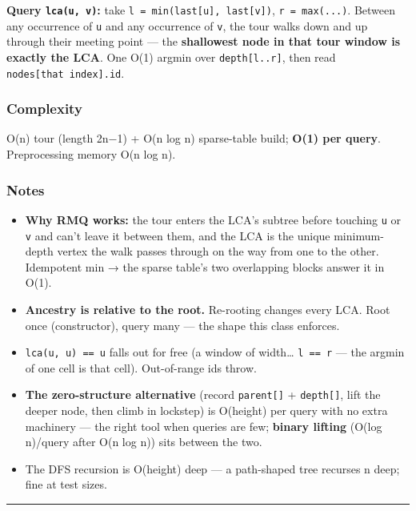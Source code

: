 \documentclass[
  10pt,
  letterpaper,
  onecolumn]{article}
\providecommand{\tightlist}{%
  \setlength{\itemsep}{0pt}\setlength{\parskip}{0pt}}
\begin{document}
\textbf{Query \texttt{lca(u,\ v)}:} take
\texttt{l\ =\ min(last{[}u{]},\ last{[}v{]})}, \texttt{r\ =\ max(...)}.
Between any occurrence of \texttt{u} and any occurrence of \texttt{v},
the tour walks down and up through their meeting point --- the
\textbf{shallowest node in that tour window is exactly the LCA}. One
O(1) argmin over \texttt{depth{[}l..r{]}}, then read
\texttt{nodes{[}that\ index{]}.id}.

\hypertarget{complexity-13}{%
\subsubsection{Complexity}\label{complexity-13}}

O(n) tour (length 2n−1) + O(n log n) sparse-table build; \textbf{O(1)
per query}. Preprocessing memory O(n log n).

\hypertarget{notes-12}{%
\subsubsection{Notes}\label{notes-12}}

\begin{itemize}
\tightlist
\item
  \textbf{Why RMQ works:} the tour enters the LCA's subtree before
  touching \texttt{u} or \texttt{v} and can't leave it between them, and
  the LCA is the unique minimum-depth vertex the walk passes through on
  the way from one to the other. Idempotent min → the sparse table's two
  overlapping blocks answer it in O(1).
\item
  \textbf{Ancestry is relative to the root.} Re-rooting changes every
  LCA. Root once (constructor), query many --- the shape this class
  enforces.
\item
  \texttt{lca(u,\ u)\ ==\ u} falls out for free (a window of
  width\ldots{} \texttt{l\ ==\ r} --- the argmin of one cell is that
  cell). Out-of-range ids throw.
\item
  \textbf{The zero-structure alternative} (record \texttt{parent{[}{]}}
  + \texttt{depth{[}{]}}, lift the deeper node, then climb in lockstep)
  is O(height) per query with no extra machinery --- the right tool when
  queries are few; \textbf{binary lifting} (O(log n)/query after O(n log
  n)) sits between the two.
\item
  The DFS recursion is O(height) deep --- a path-shaped tree recurses n
  deep; fine at test sizes.
\end{itemize}

\begin{center}\rule{0.5\linewidth}{0.5pt}\end{center}
\end{document}
